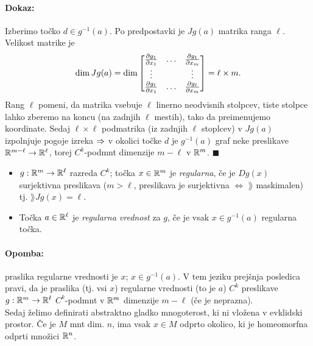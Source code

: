 \paragraph{Dokaz:} Izberimo to\v cko $d \in g^{-1} (a)$. Po predpostavki  je $Jg(a)$ matrika ranga $\ell$. Velikost matrike je
\[
	\dim Jg(a) = \dim
	\begin{bmatrix}
		\prt[1]{g_1}    & \ldots & \prt[m]{g_1}   \\
		\vdots          &        & \vdots         \\
		\prt[1]{g_\ell} & \ldots & \prt[m]{g_\ell}
	\end{bmatrix} = \ell \times m.
\]
Rang $\ell$ pomeni, da matrika vsebuje $\ell$ linerno neodvisnih stolpcev, tiste stolpce lahko zberemo na koncu (na zadnjih $\ell$ mestih),
tako da preimenujemo koordinate. Sedaj $\ell \times \ell$ podmatrika (iz zadnjih $\ell$ stoplcev) v $Jg(a)$ izpolnjuje pogoje izreka $\then$ v okolici
to\v cke $d$ je $g^{-1}(a)$ graf neke preslikave $\R^{m - \ell} \to \R^\ell$, torej $C^k$-podmnt dimenzije $m - \ell$ v $\R^m$. $\blacksquare$


\begin{defin}
	\begin{itemize}
		\item{$g : \R^m \to \R^\ell$ razreda $C^k$; to\v cka $x \in \R^m$ je \emph{regularna}, \v ce je $Dg(x)$
			surjektivna preslikava ($m > \ell$, preslikava je surjektivna $\iff$ $\rang$ maskimalen) tj. $\rang Jg(x) = \ell$.}
		\item{To\v cka $a \in \R^\ell$ je \emph{regularna vrednost} za $g$, \v ce je vsak $x \in g^{-1}(a)$ regularna
			to\v cka.}
	\end{itemize}
\end{defin}

\paragraph{Opomba:} praslika regularne vrednosti je $x$; $x \in g^{-1}(a)$. V tem jeziku prej\v snja posledica pravi, da je praslika (tj. vsi $x$)
regularne vrednosti (to je $a$) $C^k$ preslikave $g : \R^m \to \R^\ell$ $C^k$-podmnt v $\R^m$ dimenzije $m - \ell$ (\v ce je neprazna).\\[6pt]

Sedaj \v zelimo definirati abstraktno gladko mnogoterost, ki ni vlo\v zena v evklidski prostor. \v Ce je $M$ mnt dim. $n$, ima vsak $x \in M$ odprto
okolico, ki je homeomorfna odprti mno\v zici $\R^n$.

